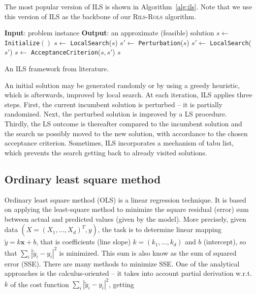 \documentclass[a4paper,12pt]{elsarticle}
\begin{document}
	The most popular version of ILS is shown in Algorithm~\ref{alg:ils}. Note that we use this version of ILS as the backbone of our \textsc{Rils}-\textsc{Rols}  algorithm.
	
	\begin{algorithm}
		\begin{algorithmic}[1] 
			\State \textbf{Input}: problem instance
			\State \textbf{Output}: an approximate (feasible) solution 
			\State $s \gets$ \texttt{Initialize}$()$
			\State  $s \gets$ \texttt{LocalSearch}($s$)
			\State  $s' \gets$ \texttt{Perturbation}($s$)
			\State  $s' \gets$ \texttt{LocalSearch}($s'$)
			\State  $ s \gets$ \texttt{AcceptanceCriterion}($s, s'$)
			\EndWhile
			\State \Return $s$
		\end{algorithmic}
		\caption{An ILS framework from   literature.}
		\label{alg:ils}
	\end{algorithm}  
	
	An initial solution may be generated randomly or by using a greedy heuristic, which is afterwards, improved by local search. At each iteration, ILS applies three steps. First, the current incumbent solution is perturbed -- it is partially randomized. Next, the perturbed solution is improved by a LS procedure. Thirdly, the LS outcome is thereafter compared to the incumbent solution and the search us possibly moved to the new solution, with accordance to the chosen acceptance criterion. Sometimes, ILS incorporates a mechanism of tabu list, which prevents the search getting back to already visited solutions.  		 
	
	\subsection{Ordinary least square method}\label{sec:ols}
	Ordinary least square method (OLS) is a linear regression technique. It is based on applying the least-square method to minimize the square residual (error) sum  between actual and predicted values (given by the model). More precisely, given data $({X}=(X_1, \ldots, X_d)^T, y)$, the task is to determine linear mapping $\tilde{y} = k \textbf{x} + b$, that is coefficients (line slope) $k = (k_1, \ldots, k_d)$ and $b$ (intercept), so that $ \sum_{i} |\tilde{y}_i - y_i|^2 $ is minimized. This sum is also know as the sum of squared error (SSE). There are many methods to minimize SSE. One of the analytical approaches is the calculus-oriented -- it takes into account   partial derivation w.r.t. $k$ of the cost function $ \sum_{i} |\tilde{y}_i - y_i|^2 $, getting 
	
\end{document}
